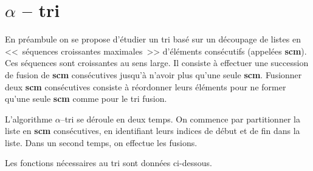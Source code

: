 \documentclass[10pt,fleqn]{article} %
\begin{document}

\vspace{2cm}
\pagestyle{fancy}
\thispagestyle{plain}

\section*{$\alpha$ -- tri}
En préambule on se propose d'étudier un tri basé sur un découpage de listes en <<~séquences croissantes maximales~>> d'éléments consécutifs (appelées \textbf{scm}). Ces séquences sont croissantes au sens large.  Il consiste à effectuer une succession de fusion de \textbf{scm} consécutives jusqu'à n'avoir plus qu'une seule \textbf{scm}. Fusionner deux \textbf{scm} consécutives consiste à réordonner leurs éléments pour ne former qu'une seule \textbf{scm} comme pour le tri fusion. 

L'algorithme $\alpha$--tri se déroule en deux temps. On commence par partitionner la liste en \textbf{scm}
consécutives, en identifiant leurs indices de début et de fin dans la liste. Dans un second temps,
on effectue les fusions.

Les fonctions nécessaires au tri sont données ci-dessous.
\end{document}
